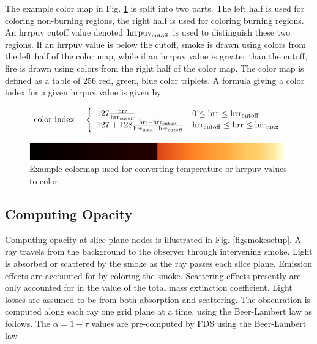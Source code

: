 {The example color map in Fig.
\ref{fig:colormaps} is split into two parts.  The left half is used
for coloring non-burning regions, the right half is used for coloring burning regions.
An hrrpuv cutoff value denoted ${\rm hrrpuv}_{\rm cutoff}$ is used to
distinguish these two regions.  
If an hrrpuv value is below the cutoff,
smoke is drawn using colors from the left half of the color map, while if an hrrpuv value is greater than the cutoff,
fire is drawn using colors from the right half of the color map.  The color map is defined as a table
of 256 red, green, blue color triplets.  A formula giving a color index for a given hrrpuv value is given by

\newcommand{\hrr}{{\rm hrr}}
\newcommand{\hrrcutoff}{{\rm hrr}_{\rm cutoff}}
\newcommand{\hrrmax}{{\rm hrr}_{\rm max}}

\begin{eqnarray}
\mbox{color index}=\left\{
\begin{array}{ll}
  127\frac{\hrr}{\hrrcutoff} & 0 \le \hrr \le \hrrcutoff \\
  127 + 128\frac{\hrr-\hrrcutoff}{\hrrmax-\hrrcutoff} & \hrrcutoff \le \hrr \le \hrrmax
\end{array}
\right.
\end{eqnarray}

\begin{figure}[\figoptions]
\begin{center}
\includegraphics[width=5.0in]{FIGURES/colorbar_fire2}
\end{center}
\caption[Example colormap used for converting temperature or hrrpuv values to color.]
{Example colormap used for converting temperature or hrrpuv values to color.}
\label{fig:colormaps}
\end{figure}


\subsection{Computing Opacity}
Computing opacity at slice plane nodes is illustrated in Fig.
\ref{figsmokesetup}. A ray travels from the background to the
observer through intervening smoke. Light is absorbed or scattered
by the smoke as the ray passes each slice plane. Emission effects
are accounted for by coloring the smoke.  Scattering effects
presently are only accounted for in the value of the total mass
extinction coefficient.  Light losses are assumed to be from both
absorption and scattering. The obscuration is computed along each
ray one grid plane at a time, using the Beer-Lambert law as
follows.  The $\alpha=1-\tau$ values are pre-computed by FDS using
the Beer-Lambert law~\cite{Siegel:2001}

}
